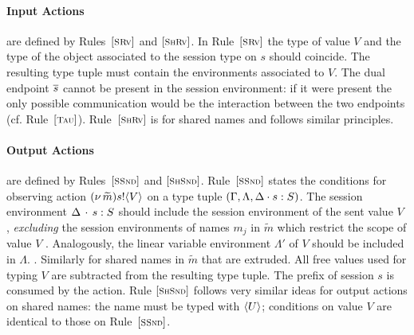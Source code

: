 \paragraph{Input Actions} 
are defined by 
Rules~${[\text{\footnotesize \textsc{SRv}}]}$ and ${[\text{\footnotesize \textsc{ShRv}}]}$.
In Rule~${[\text{\footnotesize \textsc{SRv}}]}$
the type of value $V$
and the type of the object associated to the session type on $s$ 
should coincide. 
The resulting type tuple must contain the environments 
associated to $V$. 
The
dual endpoint $\overline{s}$ cannot be
present in the session environment: if it were present
the only possible communication would be the interaction
between the two endpoints (cf. Rule~${[\text{\footnotesize \textsc{Tau}}]}$).
Rule~${[\text{\footnotesize \textsc{ShRv}}]}$ is for shared names and follows similar principles.

\paragraph{Output Actions} are defined by Rules~${[\text{\footnotesize \textsc{SSnd}}]}$
and ${[\text{\footnotesize \textsc{ShSnd}}]}$.  
Rule~${[\text{\footnotesize \textsc{SSnd}}]}$ states the conditions for observing action
$(\nu\, \widetilde{m}) s ! \langle V \rangle$ on a type tuple 
$(\Gamma, \Lambda, \Delta\cdot s : S)$. 
The session environment $\Delta \,\cdot\, s : S$ 
should include the session environment of the sent value $V$ , 
{\em excluding} the session environments of names $m_j$ 
in $\widetilde{m}$ which restrict the scope of value $V$ . 
Analogously, the linear variable environment 
$\Lambda'$ of $V$ should be included in $\Lambda$. 
. Similarly for shared 
names in $\widetilde{m}$ that are extruded.  
All free values used for typing $V$ are subtracted from the
resulting type tuple. The prefix of session $s$ is consumed
by the action.
Rule ${[\text{\footnotesize \textsc{ShSnd}}]}$ follows very similar ideas for output actions on shared names:
the name must be typed with $\langle U \rangle$; 
conditions on value $V$ are identical to those on Rule~${[\text{\footnotesize \textsc{SSnd}}]}$.

\begin{example}
\end{example}


